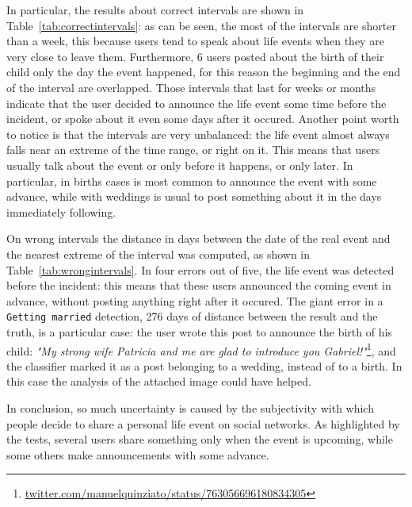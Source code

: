 In particular, the results about correct intervals are shown in Table~\ref{tab:correctintervals}: as can be seen, the most of the intervals are shorter than a week, this because users tend to speak about life events when they are very close to leave them. Furthermore, 6 users posted about the birth of their child only the day the event happened, for this reason the beginning and the end of the interval are overlapped. Those intervals that last for weeks or months indicate that the user decided to announce the life event some time before the incident, or spoke about it even some days after it occured. Another point worth to notice is that the intervals are very unbalanced: the life event almost always falls near an extreme of the time range, or right on it. This means that users usually talk about the event or only before it happens, or only later. In particular, in births cases is most common to announce the event with some advance, while with weddings is usual to post something about it in the days immediately following.

On wrong intervals the distance in days between the date of the real event and the nearest extreme of the interval was computed, as shown in Table~\ref{tab:wrongintervals}. In four errors out of five, the life event was detected before the incident: this means that these users announced the coming event in advance, without posting anything right after it occured. The giant error in a \texttt{Getting married} detection, 276 days of distance between the result and the truth, is a particular case: the user wrote this post to announce the birth of his child: \textit{"My strong wife Patricia and me are glad to introduce you Gabriel!"}\footnote{\url{twitter.com/manuelquinziato/status/763056696180834305}}, and the classifier marked it as a post belonging to a wedding, instead of to a birth. In this case the analysis of the attached image could have helped.

In conclusion, so much uncertainty is caused by the subjectivity with which people decide to share a personal life event on social networks. As highlighted by the tests, several users share something only when the event is upcoming, while some others make announcements with some advance. 

